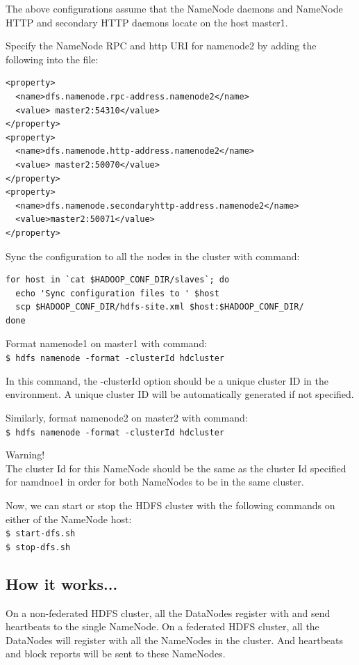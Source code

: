 The above configurations assume that the NameNode daemons and NameNode HTTP and secondary HTTP daemons locate on the host master1.

Specify the NameNode RPC and http URI for namenode2 by adding the following into the file:
\lstset{style=bashstyle}
\begin{lstlisting}
<property>
  <name>dfs.namenode.rpc-address.namenode2</name>
  <value> master2:54310</value>
</property>
<property>
  <name>dfs.namenode.http-address.namenode2</name>
  <value> master2:50070</value>
</property>
<property>
  <name>dfs.namenode.secondaryhttp-address.namenode2</name>
  <value>master2:50071</value>
</property>
\end{lstlisting}

Sync the configuration to all the nodes in the cluster with command:
\begin{verbatim}
for host in `cat $HADOOP_CONF_DIR/slaves`; do
  echo 'Sync configuration files to ' $host
  scp $HADOOP_CONF_DIR/hdfs-site.xml $host:$HADOOP_CONF_DIR/
done
\end{verbatim}

Format namenode1 on master1 with command: \\
\verb|$ hdfs namenode -format -clusterId hdcluster|

In this command, the -clusterId option should be a unique cluster ID in the environment. A unique cluster ID will be automatically generated if not specified.

Similarly, format namenode2 on master2 with command: \\
\verb|$ hdfs namenode -format -clusterId hdcluster|
\begin{warning}
Warning! \\
The cluster Id for this NameNode should be the same as the cluster Id specified for namdnoe1 in order for both NameNodes to be in the same cluster.
\end{warning}

Now, we can start or stop the HDFS cluster with the following commands on either of the NameNode host:\\
\verb|$ start-dfs.sh| \\
\verb|$ stop-dfs.sh|

\subsection*{How it works...}
On a non-federated HDFS cluster, all the DataNodes register with and send heartbeats to the single NameNode. On a federated HDFS cluster, all the DataNodes will register with all the NameNodes in the cluster. And heartbeats and block reports will be sent to these NameNodes.

